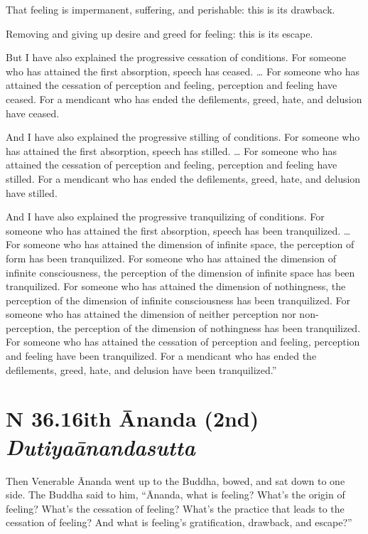 \documentclass[12pt,openany]{book}%
\newcommand*{\suttatitleacronym}[1]{\smaller[2]{#1}\vspace*{.3em}}
\newcommand*{\suttatitletranslation}[1]{\linebreak{#1}}
\newcommand*{\suttatitleroot}[1]{\linebreak\smaller[2]\itshape{#1}}
\newcommand*{\tocacronym}[1]{\hspace*{-3.3em}{#1}\quad}
\newcommand*{\toctranslation}[1]{#1}
\newcommand*{\tocroot}[1]{(\textit{#1})}
\begin{document}
That feeling is impermanent, suffering, and perishable: this is its drawback. 

Removing and giving up desire and greed for feeling: this is its escape. 

But I have also explained the progressive cessation of conditions. For someone who has attained the first absorption, speech has ceased. … For someone who has attained the cessation of perception and feeling, perception and feeling have ceased. For a mendicant who has ended the defilements, greed, hate, and delusion have ceased. 

And I have also explained the progressive stilling of conditions. For someone who has attained the first absorption, speech has stilled. … For someone who has attained the cessation of perception and feeling, perception and feeling have stilled. For a mendicant who has ended the defilements, greed, hate, and delusion have stilled. 

And I have also explained the progressive tranquilizing of conditions. For someone who has attained the first absorption, speech has been tranquilized. … For someone who has attained the dimension of infinite space, the perception of form has been tranquilized. For someone who has attained the dimension of infinite consciousness, the perception of the dimension of infinite space has been tranquilized. For someone who has attained the dimension of nothingness, the perception of the dimension of infinite consciousness has been tranquilized. For someone who has attained the dimension of neither perception nor non-perception, the perception of the dimension of nothingness has been tranquilized. For someone who has attained the cessation of perception and feeling, perception and feeling have been tranquilized. For a mendicant who has ended the defilements, greed, hate, and delusion have been tranquilized.” 

%
\section*{{\suttatitleacronym SN 36.16}{\suttatitletranslation With Ānanda (2nd) }{\suttatitleroot Dutiyaānandasutta}}
\addcontentsline{toc}{section}{\tocacronym{SN 36.16} \toctranslation{With Ānanda (2nd) } \tocroot{Dutiyaānandasutta}}

Then Venerable Ānanda went up to the Buddha, bowed, and sat down to one side. The Buddha said to him, “Ānanda, what is feeling? What’s the origin of feeling? What’s the cessation of feeling? What’s the practice that leads to the cessation of feeling? And what is feeling’s gratification, drawback, and escape?” 
\end{document}
